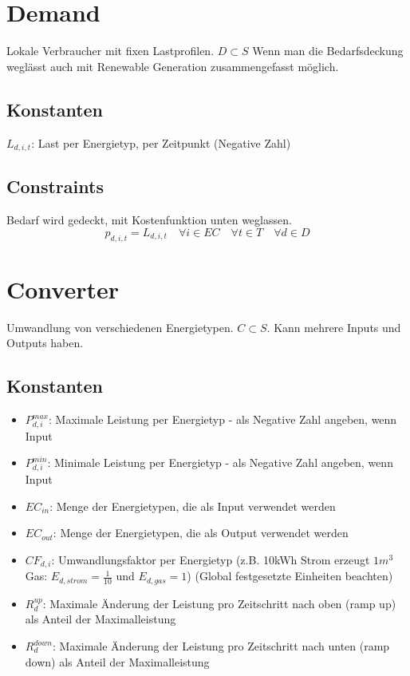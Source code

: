 \documentclass[]{article}
\begin{document}
\section{Demand}
Lokale Verbraucher mit fixen Lastprofilen. $D \subset S$
Wenn man die Bedarfsdeckung weglässt auch mit Renewable Generation zusammengefasst möglich.
\subsection{Konstanten}
$L_{d,i,t}$: Last per Energietyp, per Zeitpunkt (Negative Zahl)
\subsection{Constraints}
Bedarf wird gedeckt, mit Kostenfunktion unten weglassen.
\begin{equation}
    p_{d,i,t} = L_{d,i,t} \quad \forall i \in EC \quad \forall t \in T \quad \forall d \in D
\end{equation}


\section{Converter}
Umwandlung von verschiedenen Energietypen. $C \subset S$. Kann mehrere Inputs und Outputs haben.
\subsection{Konstanten}
\begin{itemize}
    \item $P_{d,i}^{max}$: Maximale Leistung per Energietyp - als Negative Zahl angeben, wenn Input
    \item $P_{d,i}^{min}$: Minimale Leistung per Energietyp - als Negative Zahl angeben, wenn Input
    \item $EC_{in}$: Menge der Energietypen, die als Input verwendet werden
    \item $EC_{out}$: Menge der Energietypen, die als Output verwendet werden
    \item $CF_{d,i}$: Umwandlungsfaktor per Energietyp (z.B. 10kWh Strom erzeugt $1m^3$ Gas: $E_{d,strom} = \frac{1}{10}$ und $E_{d,gas} = 1$) (Global festgesetzte Einheiten beachten)
    \item $R_{d}^{up}$: Maximale Änderung der Leistung pro Zeitschritt nach oben (ramp up) als Anteil der Maximalleistung
    \item $R_{d}^{down}$: Maximale Änderung der Leistung pro Zeitschritt nach unten (ramp down) als Anteil der Maximalleistung
\end{itemize}
\end{document}
